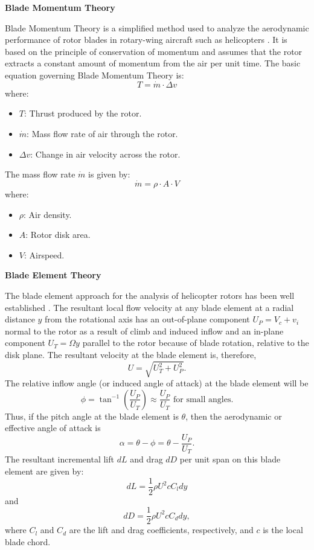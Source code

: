 \textbf{Blade Momentum Theory}

Blade Momentum Theory is a simplified method used to analyze the aerodynamic performance of rotor blades in rotary-wing aircraft such as helicopters \cite{Leishman2006}. It is based on the principle of conservation of momentum and assumes that the rotor extracts a constant amount of momentum from the air per unit time. The basic equation governing Blade Momentum Theory is:
\begin{equation}
    T = \dot{m} \cdot \Delta v \label{eq:Blade Momentum Theory}
\end{equation}
where:
\begin{itemize}
    \item $T$: Thrust produced by the rotor.
    \item $\dot{m}$: Mass flow rate of air through the rotor.
    \item $\Delta v$: Change in air velocity across the rotor.
\end{itemize}
The mass flow rate $\dot{m}$ is given by:
\begin{equation}
    \dot{m} = \rho \cdot A \cdot V
\end{equation}
where:
\begin{itemize}
    \item $\rho$: Air density.
    \item $A$: Rotor disk area.
    \item $V$: Airspeed.
\end{itemize}

\textbf{Blade Element Theory}

The blade element approach for the analysis of helicopter rotors has been well established \cite{Leishman2006}. The resultant local flow velocity at any blade element at a radial distance $y$ from the rotational axis has an out-of-plane component $U_P=V_c+v_i$ normal to the rotor as a result of climb and induced inflow and an in-plane component $U_T=\Omega y$ parallel to the rotor because of blade rotation, relative to the disk plane. The resultant velocity at the blade element is, therefore,
\begin{equation}
U=\sqrt{U_T^{2}+U_P^{2}}.
\end{equation}
The relative inflow angle (or induced angle of attack) at the blade element will be
\begin{equation}
\phi=\tan^{-1}\left(\frac{U_P}{U_T}\right)\approx\frac{U_P}{U_T} \text{ for small angles.}
\end{equation}
Thus, if the pitch angle at the blade element is $\theta$, then the aerodynamic or effective angle of attack is
\begin{equation}
\alpha=\theta-\phi=\theta-\frac{U_P}{U_T}.
\end{equation}
The resultant incremental lift $dL$ and drag $dD$ per unit span on this blade element are given by:
\begin{equation}
dL=\frac{1}{2}\rho U^{2}cC_l dy
\end{equation}
and
\begin{equation}
dD=\frac{1}{2}\rho U^{2}cC_d dy,
\end{equation}
where $C_l$ and $C_d$ are the lift and drag coefficients, respectively, and $c$ is the local blade chord.

